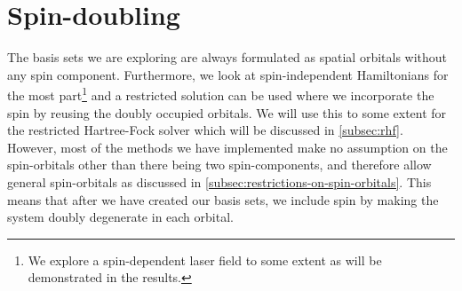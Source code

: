     \section{Spin-doubling}
        The basis sets we are exploring are always formulated as spatial
        orbitals without any spin component.
        Furthermore, we look at spin-independent Hamiltonians for the most
        part\footnote{%
            We explore a spin-dependent laser field to some extent as will be
            demonstrated in the results.
        } and a restricted solution can be used where we incorporate the spin by
        reusing the doubly occupied orbitals.
        We will use this to some extent for the restricted Hartree-Fock solver
        which will be discussed in \autoref{subsec:rhf}.
        However, most of the methods we have implemented make no assumption on the
        spin-orbitals other than there being two spin-components, and therefore
        allow general spin-orbitals as discussed in
        \autoref{subsec:restrictions-on-spin-orbitals}.
        This means that after we have created our basis sets, we include spin by
        making the system doubly degenerate in each orbital.

